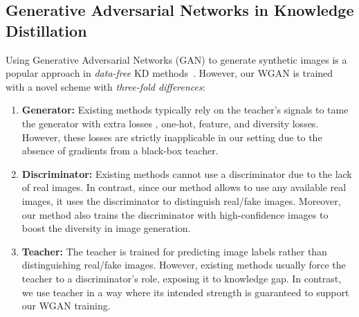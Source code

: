 \subsection{Generative Adversarial Networks in Knowledge Distillation}
\begin{foldable}
  Using Generative Adversarial Networks (GAN) to generate synthetic images is a popular approach in \textit{data-free} KD methods~\cite{chen2019data,addepalli2020degan,do2022momentum,zhang2022ideal}.
  However, our WGAN is trained with a novel scheme with \textit{three-fold differences}:
  \begin{enumerate}
    \item {
        \textbf{Generator:} Existing methods typically rely on the teacher's signals to tame the generator with extra losses \eg, one-hot, feature, and diversity losses.
        However, these losses are strictly inapplicable in our setting due to the absence of gradients from a black-box teacher.
      }
    \item {
        \textbf{Discriminator:} Existing methods cannot use a discriminator due to the lack of real images.
        In contrast, since our method allows to use any available real images, it uses the discriminator to distinguish real/fake images.
        Moreover, our method also trains the discriminator with high-confidence images to boost the diversity in image generation.
      }
    \item {
        \textbf{Teacher:} The teacher is trained for predicting image labels rather than distinguishing real/fake images.
        However, existing methods usually force the teacher to a discriminator's role, exposing it to knowledge gap.
        In contrast, we use teacher in a way where its intended strength is guaranteed to support our WGAN training.
      }
  \end{enumerate}
\end{foldable}
